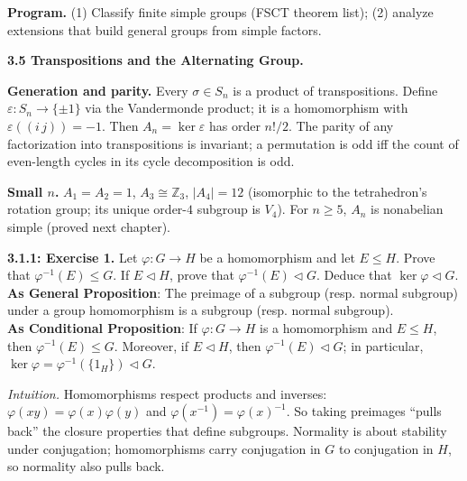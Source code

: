 \documentclass[12pt]{article}
\theoremstyle{definition}
\begin{document}
\medskip
\textbf{Program.} (1) Classify finite simple groups (FSCT theorem list); (2) analyze extensions that build general groups from simple factors.

\newpage

\textbf{3.5 Transpositions and the Alternating Group.}

\newpage

\medskip
\textbf{Generation and parity.} Every $\sigma\in S_n$ is a product of transpositions. Define $\varepsilon:S_n\to\{\pm1\}$ via the Vandermonde product; it is a homomorphism with $\varepsilon((i\,j))=-1$. Then $A_n=\ker\varepsilon$ has order $n!/2$. The parity of any factorization into transpositions is invariant; a permutation is odd iff the count of even-length cycles in its cycle decomposition is odd.

\medskip
\textbf{Small $n$.} $A_1=A_2=1$, $A_3\cong \mathbb{Z}_3$, $|A_4|=12$ (isomorphic to the tetrahedron’s rotation group; its unique order-$4$ subgroup is $V_4$). For $n\ge 5$, $A_n$ is nonabelian simple (proved next chapter).

\newpage

\newpage

\noindent \textbf{3.1.1: Exercise 1.} Let $\varphi:G\to H$ be a homomorphism and let $E\le H$. Prove that $\varphi^{-1}(E)\le G$. If $E\lhd H$, prove that $\varphi^{-1}(E)\lhd G$. Deduce that $\ker\varphi\lhd G$.\\ %

\noindent\textbf{As General Proposition}: The preimage of a subgroup (resp. normal subgroup) under a group homomorphism is a subgroup (resp. normal subgroup).\\

\noindent \textbf{As Conditional Proposition}: If $\varphi:G\to H$ is a homomorphism and $E\le H$, then $\varphi^{-1}(E)\le G$. Moreover, if $E\lhd H$, then $\varphi^{-1}(E)\lhd G$; in particular, $\ker\varphi=\varphi^{-1}(\{1_H\})\lhd G$.\\

\newpage

\dotfill

\emph{Intuition.} Homomorphisms respect products and inverses: $\varphi(xy)=\varphi(x)\varphi(y)$ and $\varphi(x^{-1})=\varphi(x)^{-1}$. So taking preimages “pulls back” the closure properties that define subgroups. Normality is about stability under conjugation; homomorphisms carry conjugation in $G$ to conjugation in $H$, so normality also pulls back.\\
\end{document}

